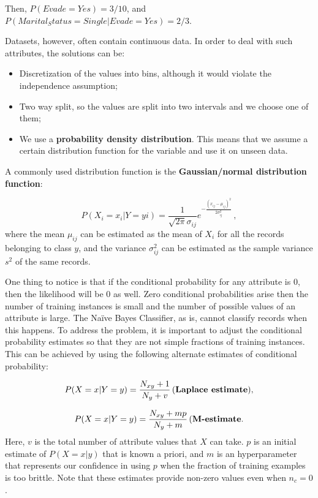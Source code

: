 Then, $P(Evade = Yes) = 3/10$, and $P(Marital_Status = Single | Evade = Yes) = 2/3$.

Datasets, however, often contain continuous data. In order to deal with such attributes, the solutions can be:
\begin{itemize}
    \item Discretization of the values into bins, although it would violate the independence assumption;
    \item Two way split, so the values are split into two intervals and we choose one of them;
    \item We use a \textbf{probability density distribution}. This means that we assume a certain distribution function for the variable and use it on unseen data.
\end{itemize}

A commonly used distribution function is the \textbf{Gaussian/normal distribution function}:

\begin{equation*}
    P(X_i = x_i | Y = yi) = \dfrac{1}{\sqrt{2 \pi} \sigma_{ij}} e^{-\frac{(x_{ij} - \mu_{ij})^2}{2 \sigma_{ij}^2}} \, ,
\end{equation*}
where the mean $\mu_{ij}$ can be estimated as the mean of $X_i$ for all the records belonging to class $y$, and the variance $\sigma_{ij}^2$ can be estimated as the sample variance $s^2$ of the same records.

One thing to notice is that if the conditional probability for any attribute is 0, then the likelihood will be 0 as well. Zero conditional probabilities arise then the number of training instances is small and the number of possible values of an attribute is large. The Naïve Bayes Classifier, as is, cannot classify records when this happens. To address the problem, it is important to adjust the conditional probability estimates so that they are not simple fractions of training instances. This can be achieved by using the following alternate estimates of conditional probability:

\begin{equation*}
    P(X = x| Y = y) = \dfrac{N_{xy} + 1}{N_y + v} \, \text{(\textbf{Laplace estimate})},
\end{equation*}

\begin{equation*}
    P(X = x| Y = y) = \dfrac{N_{xy} + mp}{N_y + m} \, \text{(\textbf{M-estimate}}.
\end{equation*}
Here, $v$ is the total number of attribute values that $X$ can take. $p$ is an initial estimate of $P(X = x | y)$ that is known a priori, and $m$ is an hyperparameter that represents our confidence in using $p$ when the fraction of training examples is too brittle. Note that these estimates provide non-zero values even when $n_c = 0$.

